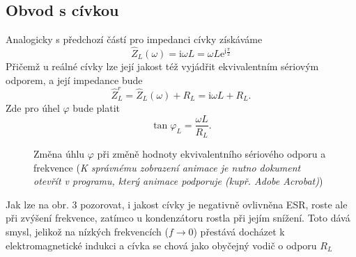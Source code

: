 \documentclass[czech,11pt,a4paper]{article}
\begin{document}
\begin{multicols}{2}
		\subsection{Obvod s cívkou}
		Analogicky s předchozí částí pro impedanci cívky získáváme
		\begin{equation}
			\hat{Z}_{L}(\omega)=\mathrm{i} \omega L=\omega L \mathrm{e}^{\mathrm{i} \frac{\pi}{2}} 
		\end{equation}
		Přičemž u reálné cívky lze její jakost též vyjádřit ekvivalentním sériovým odporem, a její impedance bude
		\begin{equation}
			\hat{Z}_{L}^{r}=\hat{Z}_{L}(\omega)+R_{L}=\mathrm{i} \omega L+R_{L}.
		\end{equation}
		Zde pro úhel $\varphi$ bude platit
		\begin{equation}
			\tan \varphi_{L}=\frac{\omega L}{R_{L}} .
		\end{equation}
		\begin{figure}[H]
			\begin{center}
				\caption{Změna úhlu $\varphi$ při změně hodnoty ekvivalentního sériového odporu a frekvence (\textit{K správnému zobrazení animace je nutno dokument otevřít v programu, který animace podporuje (kupř. Adobe Acrobat)})}
				
			\end{center}
		\end{figure}		
		Jak lze na obr. 3 pozorovat, i jakost cívky je negativně ovlivněna ESR, roste ale při zvýšení frekvence, zatímco u kondenzátoru rostla při jejím snížení. Toto dává smysl, jelikož na nízkých frekvencích ($f \rightarrow 0$) přestává docházet k elektromagnetické indukci a cívka se chová jako obyčejný vodič o odporu $R_L$

\end{multicols}
\end{document}
